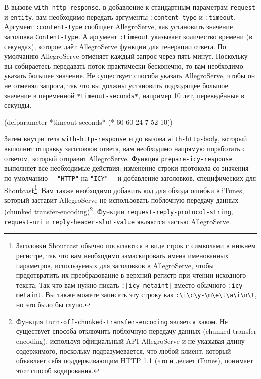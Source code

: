 В вызове \lstinline{with-http-response}, в добавление к стандартным параметрам \lstinline{request} и
\lstinline{entity}, вам необходимо передать аргументы \lstinline{:content-type} и \lstinline{:timeout}.
Аргумент \lstinline{:content-type} сообщает AllegroServe, как установить значение заголовка
\lstinline{Content-Type}.  А аргумент \lstinline{:timeout} указывает количество времени (в
секундах), которое даёт AllegroServe функции для генерации ответа. По умолчанию
AllegroServe отменяет каждый запрос через пять минут.  Поскольку вы собираетесь передавать
поток практически бесконечно, то вам необходимо указать большее значение.  Не существует
способа указать AllegroServe, чтобы он не отменял запроса, так что вы должны установить
подходящее большое значение в переменной \lstinline{*timeout-seconds*}, например 10 лет,
переведённые в секунды.

\begin{myverb}
(defparameter *timeout-seconds* (* 60 60 24 7 52 10))
\end{myverb}

Затем внутри тела \lstinline{with-http-response} и до вызова \lstinline{with-http-body}, который
выполнит отправку заголовков ответа, вам необходимо напрямую поработать с ответом, который
отправит AllegroServe.  Функция \lstinline{prepare-icy-response} выполняет все необходимые
действия: изменение строки протокола со значения по умолчанию~-- \lstinline{"HTTP"} на
\lstinline{"ICY"}~-- и добавление заголовков, специфических для Shoutcast\footnote{Заголовки
  Shoutcast обычно посылаются в виде строк с символами в нижнем регистре, так что вам
  необходимо замаскировать имена именованных параметров, используемых для заголовков в
  AllegroServe, чтобы предотвратить их преобразование в верхний регистр при чтении
  исходного текста.  Так что вам нужно писать \lstinline{:|icy-metaint|} вместо обычного
  \lstinline{:icy-metaint}.  Вы также можете записать эту строку как
  \lstinline!:\i\c\y-\m\e\t\a\i\n\t!, но это было бы глупо.}.  Вам также необходимо
добавить код для обхода ошибки в iTunes, который заставит AllegroServe не использовать
поблочную передачу данных (chunked transfer-encoding)\footnote{Функция
  \lstinline{turn-off-chunked-transfer-encoding} является хаком.  Не существует способа
  отключить поблочную передачу данных (chunked transfer encoding), используя официальный API AllegroServe и не
  указывая длину содержимого, поскольку подразумевается, что любой клиент, который
  объявляет себя поддерживающим HTTP 1.1 (что и делает iTunes), понимает этот способ
  кодирования.}.  Функции \lstinline{request-reply-protocol-string}, \lstinline{request-uri} и
\lstinline{reply-header-slot-value} являются частью AllegroServe.

